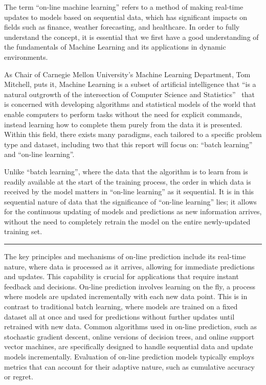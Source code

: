 \documentclass[11pt]{article} %
\theoremstyle{plain}
\theoremstyle{definition}
\begin{document}
The term ``on-line machine learning'' refers to a method of making real-time updates to models based on sequential data, which has significant impacts on fields such as finance, weather forecasting, and healthcare. In order to fully understand the concept, it is essential that we first have a good understanding of the fundamentals of Machine Learning and its applications in dynamic environments.

As Chair of Carnegie Mellon University's Machine Learning Department, Tom Mitchell, puts it, Machine Learning is a subset of artificial intelligence that ``is a natural outgrowth of the intersection of Computer Science and Statistics''\ \cite{mitchell:2006} that is concerned with developing algorithms and statistical models of the world that enable computers to perform tasks without the need for explicit commands, instead learning how to complete them purely from the data it is presented. Within this field, there exists many paradigms, each tailored to a specific problem type and dataset, including two that this report will focus on: ``batch learning'' and ``on-line learning''. 

Unlike ``batch learning'', where the data that the algorithm is to learn from is readily available at the start of the training process, the order in which data is received by the model matters in ``on-line learning'' as it sequential. It is in this sequential nature of data that the significance of ``on-line learning'' lies; it allows for the continuous updating of models and predictions as new information arrives, without the need to completely retrain the model on the entire newly-updated training set. 


\noindent\rule{\textwidth}{0.1pt}

The key principles and mechanisms of on-line prediction include its real-time nature, where data is processed as it arrives, allowing for immediate predictions and updates. This capability is crucial for applications that require instant feedback and decisions. On-line prediction involves learning on the fly, a process where models are updated incrementally with each new data point. This is in contrast to traditional batch learning, where models are trained on a fixed dataset all at once and used for predictions without further updates until retrained with new data. Common algorithms used in on-line prediction, such as stochastic gradient descent, online versions of decision trees, and online support vector machines, are specifically designed to handle sequential data and update models incrementally. Evaluation of on-line prediction models typically employs metrics that can account for their adaptive nature, such as cumulative accuracy or regret.
\end{document}
